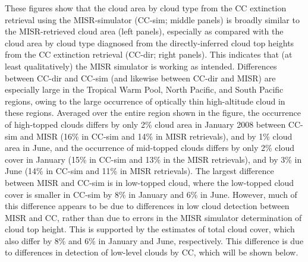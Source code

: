These figures show that the cloud area by cloud type from the CC
extinction retrieval using the MISR-simulator (CC-sim; middle panels) is
broadly similar to the MISR-retrieved cloud area (left panels),
especially as compared with the cloud area by cloud type diagnosed from
the directly-inferred cloud top heights from the CC extinction retrieval
(CC-dir; right panels). This indicates that (at least qualitatively) the
MISR simulator is working as intended. Differences between CC-dir and
CC-sim (and likewise between CC-dir and MISR) are especially large in
the Tropical Warm Pool, North Pacific, and South Pacific regions, owing
to the large occurrence of optically thin high-altitude cloud in these
regions. Averaged over the entire region shown in the figure, the
occurrence of high-topped clouds differs by only 2\% cloud area in
January 2008 between CC-sim and MISR (16\% in CC-sim and 14\% in MISR
retrievals), and by 1\% cloud area in June, and the occurrence of
mid-topped clouds differs by only 2\% cloud cover in January (15\% in
CC-sim and 13\% in the MISR retrievals), and by 3\% in June (14\% in
CC-sim and 11\% in MISR retrievals). The largest difference between MISR
and CC-sim is in low-topped cloud, where the low-topped cloud cover is
smaller in CC-sim by 8\% in January and 6\% in June. However, much of
this difference appears to be due to differences in low cloud detection
between MISR and CC, rather than due to errors in the MISR simulator
determination of cloud top height. This is supported by the estimates of
total cloud cover, which also differ by 8\% and 6\% in January and June,
respectively. This difference is due to differences in detection of
low-level clouds by CC, which will be shown below.

